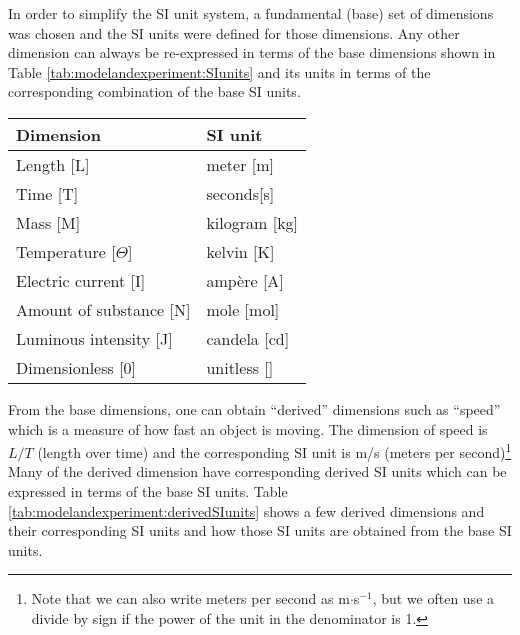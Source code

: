 In order to simplify the SI unit system, a fundamental (base) set of dimensions was chosen and the SI units were defined for those dimensions. Any other dimension can always be re-expressed in terms of the base dimensions shown in Table \ref{tab:modelandexperiment:SIunits} and its units in terms of the corresponding combination of the base SI units.

\begin{center}
\begin{tabular}{ll }
\textbf{Dimension}&\textbf{SI unit}\\
\hline
\hline
Length [L]& meter [m]\\ \hline
Time [T]& seconds[s] \\ \hline
Mass [M]& kilogram [kg]\\ \hline
Temperature [$\Theta$]& kelvin [K] \\ \hline
Electric current [I]& amp\`ere [A]\\ \hline
Amount of substance [N]& mole [mol] \\ \hline
Luminous intensity [J]& candela [cd] \\ \hline
Dimensionless [0]& unitless [] \\ \hline
\end{tabular}
\end{center}

From the base dimensions, one can obtain ``derived'' dimensions such as ``speed'' which is a measure of how fast an object is moving. The dimension of speed is $L/T$ (length over time) and the corresponding SI unit is m/s (meters per second)\footnote{Note that we can also write meters per second as m$\cdot$s$^{-1}$, but we often use a divide by sign if the power of the unit in the denominator is 1.} Many of the derived dimension have corresponding derived SI units which can be expressed in terms of the base SI units. Table \ref{tab:modelandexperiment:derivedSIunits} shows a few derived dimensions and their corresponding SI units and how those SI units are obtained from the base SI units.

